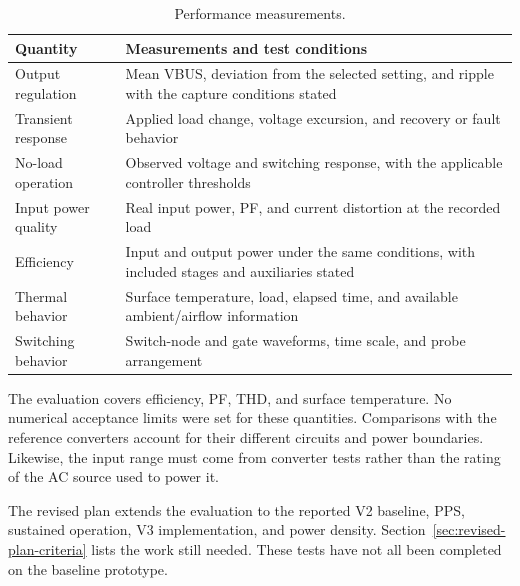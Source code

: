 \begin{table}[H]
\centering
\caption{Performance measurements.}
\label{tab:req-measured-quantities}
\begin{tabularx}{\textwidth}{@{}L{0.28\textwidth}Y@{}}
\toprule
Quantity & Measurements and test conditions\\
\midrule
Output regulation & Mean VBUS, deviation from the selected setting, and ripple with the capture conditions stated\\
Transient response & Applied load change, voltage excursion, and recovery or fault behavior\\
No-load operation & Observed voltage and switching response, with the applicable controller thresholds\\
Input power quality & Real input power, PF, and current distortion at the recorded load\\
Efficiency & Input and output power under the same conditions, with included stages and auxiliaries stated\\
Thermal behavior & Surface temperature, load, elapsed time, and available ambient/airflow information\\
Switching behavior & Switch-node and gate waveforms, time scale, and probe arrangement\\
\bottomrule
\end{tabularx}
\end{table}

The evaluation covers efficiency, PF, THD, and surface temperature. No numerical acceptance limits were set for these quantities. Comparisons with the reference converters account for their different circuits and power boundaries. Likewise, the input range must come from converter tests rather than the rating of the AC source used to power it.

The revised plan extends the evaluation to the reported V2 baseline, PPS, sustained operation, V3 implementation, and power density. Section~\ref{sec:revised-plan-criteria} lists the work still needed. These tests have not all been completed on the baseline prototype.
